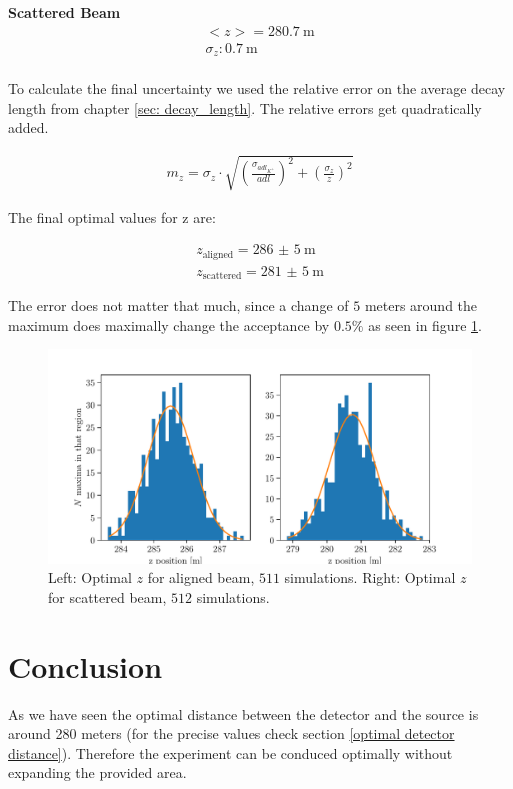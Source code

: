 \documentclass[12pt,a4paper,oneside,english]{article}
\begin{document}
	\textbf{Scattered Beam}
		\begin{align*}
		<z> = \SI{280.7}{\meter}\\
		\sigma _z  : \SI{0.7}{\meter}\\
		\end{align*}
		
		To calculate the final uncertainty we used the relative error on the average decay length from chapter \ref{sec: decay_length}. The relative errors get quadratically added.
		
		\begin{align}
			m_z = \sigma _z \cdot \sqrt{ \left(\frac{\sigma_{adl_{K^+}}}{adl}\right)^2 +  \left(\frac{\sigma_z}{z}\right)^2}
		\end{align}
		
		The final optimal values for z are:
		
		\begin{align*}
			z_{\text{aligned}} =  \SI{286(5)}{\meter}\\
			z_{\text{scattered}} =  \SI{281(5)}{\meter}
		\end{align*}
		
		The error does not matter that much, since a change of $5$ meters around the maximum does maximally change the acceptance by $0.5\%$ as seen in figure \ref{fig:optimalzpos}.
		
\begin{figure}[H]
\centering
	\includegraphics[width=1\linewidth]{images/optimal_zpos.pdf}
	\caption{Left: Optimal $z$ for aligned beam, $511$ simulations. Right: Optimal $z$ for scattered beam, $512$ simulations.}
	\label{fig:optimalzpos}
\end{figure}

\section{Conclusion}
As we have seen the optimal distance between the detector and the source is around 280 meters (for the precise values check section \ref{optimal detector distance}). Therefore the experiment can be conduced optimally without expanding the provided area.
\end{document}
